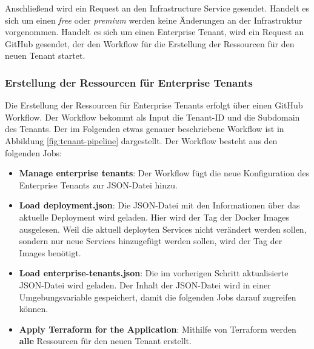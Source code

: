 Anschließend wird ein Request an den Infrastructure Service gesendet.
Handelt es sich um einen \textit{free} oder \textit{premium} werden keine Änderungen an der Infrastruktur vorgenommen.
Handelt es sich um einen Enterprise Tenant, wird ein Request an GitHub gesendet, der
den Workflow für die Erstellung der Ressourcen für den neuen Tenant startet.

\subsubsection{Erstellung der Ressourcen für Enterprise Tenants}

Die Erstellung der Ressourcen für Enterprise Tenants erfolgt über einen GitHub Workflow.
Der Workflow bekommt als Input die Tenant-ID und die Subdomain des Tenants.
Der im Folgenden etwas genauer beschriebene Workflow ist in Abbildung \ref{fig:tenant-pipeline} dargestellt.
Der Workflow besteht aus den folgenden Jobs:
\begin{itemize}
  \item \textbf{Manage enterprise tenants}: Der Workflow fügt die neue Konfiguration des Enterprise Tenants zur JSON-Datei hinzu.
  \item \textbf{Load deployment.json}: Die JSON-Datei mit den Informationen über das aktuelle Deployment wird geladen. Hier wird der
  Tag der Docker Images ausgelesen. Weil die aktuell deployten Services nicht verändert werden sollen, sondern nur neue Services 
  hinzugefügt werden sollen, wird der Tag der Images benötigt.
  \item \textbf{Load enterprise-tenants.json}: Die im vorherigen Schritt aktualisierte JSON-Datei wird geladen. Der Inhalt der JSON-Datei
  wird in einer Umgebungsvariable gespeichert, damit die folgenden Jobs darauf zugreifen können.
  \item \textbf{Apply Terraform for the Application}: Mithilfe von Terraform werden \textbf{alle} Ressourcen für den neuen Tenant erstellt.
\end{itemize}

